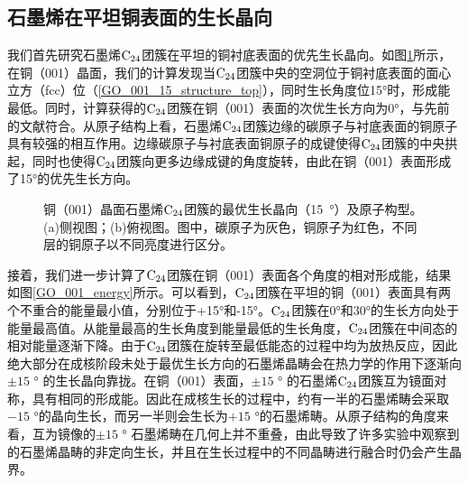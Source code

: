     \subsection{石墨烯在平坦铜表面的生长晶向}
        我们首先研究石墨烯$\rm{C_{24}}$团簇在平坦的铜衬底表面的优先生长晶向。如图\ref{GO_001_15_structure}所示，在铜（001）晶面，我们的计算发现当$\rm{C_{24}}$团簇中央的空洞位于铜衬底表面的面心立方（fcc）位（\ref{GO_001_15_structure_top}），同时生长角度位15\si{\degree}时，形成能最低。同时，计算获得的$\rm{C_{24}}$团簇在铜（001）表面的次优生长方向为0\si{\degree}，与先前的文献符合。从原子结构上看，石墨烯$\rm{C_{24}}$团簇边缘的碳原子与衬底表面的铜原子具有较强的相互作用。边缘碳原子与衬底表面铜原子的成键使得$\rm{C_{24}}$团簇的中央拱起，同时也使得$\rm{C_{24}}$团簇向更多边缘成键的角度旋转，由此在铜（001）表面形成了15\si{\degree}的优先生长方向。

        \begin{figure}[htbp]
            \caption{铜（001）晶面石墨烯$\rm{C_{24}}$团簇的最优生长晶向（\SI{15}{\degree}）及原子构型。(a)侧视图；(b)俯视图。图中，碳原子为灰色，铜原子为红色，不同层的铜原子以不同亮度进行区分。
            }
            \label{GO_001_15_structure}
        \end{figure}

        接着，我们进一步计算了$\rm{C_{24}}$团簇在铜（001）表面各个角度的相对形成能，结果如图\ref{GO_001_energy}所示。可以看到，$\rm{C_{24}}$团簇在平坦的铜（001）表面具有两个不重合的能量最小值，分别位于+15\si{\degree}和-15\si{\degree}。$\rm{C_{24}}$团簇在0\si{\degree}和30\si{\degree}的生长方向处于能量最高值。从能量最高的生长角度到能量最低的生长角度，$\rm{C_{24}}$团簇在中间态的相对能量逐渐下降。由于$\rm{C_{24}}$团簇在旋转至最低能态的过程中均为放热反应，因此绝大部分在成核阶段未处于最优生长方向的石墨烯晶畴会在热力学的作用下逐渐向$\pm 15$ \si{\degree} 的生长晶向靠拢。在铜（001）表面，$\pm 15$ \si{\degree} 的石墨烯$\rm{C_{24}}$团簇互为镜面对称，具有相同的形成能。因此在成核生长的过程中，约有一半的石墨烯畴会采取$-15$ \si{\degree}的晶向生长，而另一半则会生长为$+15$ \si{\degree}的石墨烯畴。从原子结构的角度来看，互为镜像的$\pm 15$ \si{\degree} 石墨烯畴在几何上并不重叠，由此导致了许多实验中观察到的石墨烯晶畴的非定向生长，并且在生长过程中的不同晶畴进行融合时仍会产生晶界。

